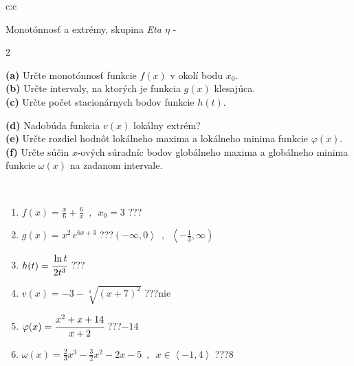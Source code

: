 \documentclass[10pt]{report}
\begin{document}
\newpage
\thispagestyle{empty}
\begin{tabular}{c:c}
\begin{minipage}[c][104.5mm][t]{0.5\linewidth}
\begin{center}
\vspace{7mm}
{\huge Monotónnosť a extrémy, skupina \textit{Eta $\eta$} -}\\[5mm]
\begin{minipage}{0.95\linewidth}
\begin{center}
{\small \begin{multicols}{2} \raggedright
\textbf{(a)} Určte monotónnosť funkcie \(f(x)\) v okolí bodu \(x_0\). \\[1mm]
\textbf{(b)} Určte intervaly, na ktorých je funkcia \(g(x)\) klesajúca. \\[1mm]
\textbf{(c)} Určte počet stacionárnych bodov funkcie \(h(t)\). \par \columnbreak
\textbf{(d)} Nadobúda funkcia \(v(x)\) lokálny extrém? \\[1mm]
\textbf{(e)} Určte rozdiel hodnôt lokálneho maxima a lokálneho minima funkcie \(\varphi(x)\). \\[1mm]
\textbf{(f)} Určte súčin \(x\)-ových súradníc bodov globálneho maxima a globálneho minima funkcie \(\omega(x)\) na zadanom intervale. \\[1mm]
\end{multicols}
}
\end{center}
\end{minipage}
\\[4mm]
\begin{minipage}{0.79\linewidth}
\begin{center}
\begin{varwidth}{\linewidth}
\begin{enumerate}
\normalsize
\item $f(x)=\frac{x}{6}+\frac{6}{x} \enspace , \enspace x_0=3$\quad \dotfill\; ???\;\dotfill \quad {}
\item $g(x)=x^2\, e^{6x+3}$\quad \dotfill\; ???\;\dotfill \quad $\left(-\infty , 0\right\rangle\enspace , \enspace \left\langle-\frac{1}{3} , \infty\right)$
\item $h(t)=\cfrac{\ln t}{2t^3}$\quad \dotfill\; ???\;\dotfill {}
\item $v(x)=-3-\sqrt[3]{(x+7)^2}$\quad \dotfill\; ???\;\dotfill \quad $\text{nie}$
\item $\varphi(x)=\cfrac{x^2+x+14}{x+2}$\quad \dotfill\; ???\;\dotfill \quad $-14$
\item $\omega(x)=\frac{2}{3}x^3-\frac{3}{2}x^2-2x-5 \enspace , \enspace x\in\left\langle-1 , 4\right\rangle$\quad \dotfill\; ???\;\dotfill \quad $8$

\end{enumerate}
\end{varwidth}
\end{center}
\end{minipage}
\end{center}
\end{minipage}
\end{tabular}
\end{document}

